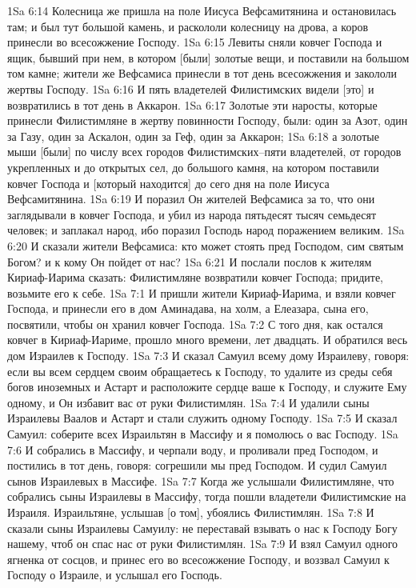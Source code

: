 1Sa 6:14  Колесница же пришла на поле Иисуса Вефсамитянина и остановилась там; и был тут большой камень, и раскололи колесницу на дрова, а коров принесли во всесожжение Господу.
1Sa 6:15  Левиты сняли ковчег Господа и ящик, бывший при нем, в котором [были] золотые вещи, и поставили на большом том камне; жители же Вефсамиса принесли в тот день всесожжения и закололи жертвы Господу.
1Sa 6:16  И пять владетелей Филистимских видели [это] и возвратились в тот день в Аккарон.
1Sa 6:17  Золотые эти наросты, которые принесли Филистимляне в жертву повинности Господу, были: один за Азот, один за Газу, один за Аскалон, один за Геф, один за Аккарон;
1Sa 6:18  а золотые мыши [были] по числу всех городов Филистимских--пяти владетелей, от городов укрепленных и до открытых сел, до большого камня, на котором поставили ковчег Господа и [который находится] до сего дня на поле Иисуса Вефсамитянина.
1Sa 6:19  И поразил Он жителей Вефсамиса за то, что они заглядывали в ковчег Господа, и убил из народа пятьдесят тысяч семьдесят человек; и заплакал народ, ибо поразил Господь народ поражением великим.
1Sa 6:20  И сказали жители Вефсамиса: кто может стоять пред Господом, сим святым Богом? и к кому Он пойдет от нас?
1Sa 6:21  И послали послов к жителям Кириаф-Иарима сказать: Филистимляне возвратили ковчег Господа; придите, возьмите его к себе.
1Sa 7:1  И пришли жители Кириаф-Иарима, и взяли ковчег Господа, и принесли его в дом Аминадава, на холм, а Елеазара, сына его, посвятили, чтобы он хранил ковчег Господа.
1Sa 7:2  С того дня, как остался ковчег в Кириаф-Иариме, прошло много времени, лет двадцать. И обратился весь дом Израилев к Господу.
1Sa 7:3  И сказал Самуил всему дому Израилеву, говоря: если вы всем сердцем своим обращаетесь к Господу, то удалите из среды себя богов иноземных и Астарт и расположите сердце ваше к Господу, и служите Ему одному, и Он избавит вас от руки Филистимлян.
1Sa 7:4  И удалили сыны Израилевы Ваалов и Астарт и стали служить одному Господу.
1Sa 7:5  И сказал Самуил: соберите всех Израильтян в Массифу и я помолюсь о вас Господу.
1Sa 7:6  И собрались в Массифу, и черпали воду, и проливали пред Господом, и постились в тот день, говоря: согрешили мы пред Господом. И судил Самуил сынов Израилевых в Массифе.
1Sa 7:7  Когда же услышали Филистимляне, что собрались сыны Израилевы в Массифу, тогда пошли владетели Филистимские на Израиля. Израильтяне, услышав [о том], убоялись Филистимлян.
1Sa 7:8  И сказали сыны Израилевы Самуилу: не переставай взывать о нас к Господу Богу нашему, чтоб он спас нас от руки Филистимлян.
1Sa 7:9  И взял Самуил одного ягненка от сосцов, и принес его во всесожжение Господу, и воззвал Самуил к Господу о Израиле, и услышал его Господь.
